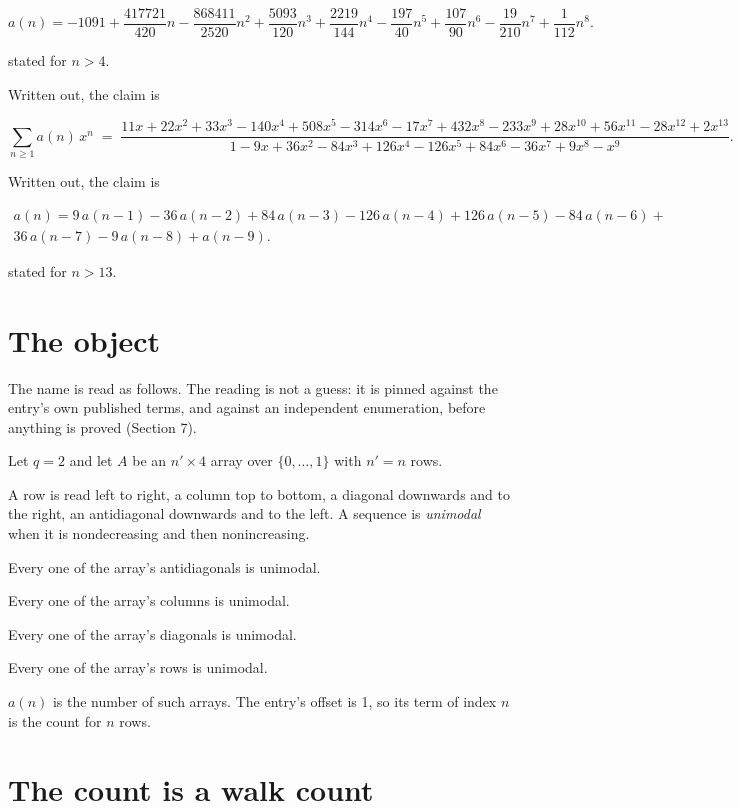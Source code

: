 \documentclass[11pt]{article}
\theoremstyle{definition}
\begin{document}
\[a(n) = -1091 + \frac{417721}{420}n - \frac{868411}{2520}n^{2} + \frac{5093}{120}n^{3} + \frac{2219}{144}n^{4} - \frac{197}{40}n^{5} + \frac{107}{90}n^{6} - \frac{19}{210}n^{7} + \frac{1}{112}n^{8}.\]

stated for $n > 4$.

Written out, the claim is

\[\sum_{n \ge 1} a(n)\,x^n \;=\; \frac{11x + 22x^{2} + 33x^{3} - 140x^{4} + 508x^{5} - 314x^{6} - 17x^{7} + 432x^{8} - 233x^{9} + 28x^{10} + 56x^{11} - 28x^{12} + 2x^{13}}{1 - 9x + 36x^{2} - 84x^{3} + 126x^{4} - 126x^{5} + 84x^{6} - 36x^{7} + 9x^{8} - x^{9}}.\]

Written out, the claim is

\begin{multline*} a(n) = 9\,a(n-1) - 36\,a(n-2) + 84\,a(n-3) - 126\,a(n-4) + 126\,a(n-5) - 84\,a(n-6) + \\ 36\,a(n-7) - 9\,a(n-8) + a(n-9). \end{multline*}

stated for $n > 13$.

\section{The object}

The name is read as follows. The reading is not a guess: it is pinned against the entry's own published terms, and against an independent enumeration, before anything is proved (Section 7).

Let $q = 2$ and let $A$ be an $n' \times 4$ array over $\{0,\dots,1\}$ with $n' = n$ rows.

A row is read left to right, a column top to bottom, a diagonal downwards and to the right, an antidiagonal downwards and to the left. A sequence is {\itshape unimodal} when it is nondecreasing and then nonincreasing.

Every one of the array's antidiagonals is unimodal.

Every one of the array's columns is unimodal.

Every one of the array's diagonals is unimodal.

Every one of the array's rows is unimodal.

$a(n)$ is the number of such arrays. The entry's offset is 1, so its term of index $n$ is the count for $n$ rows.

\section{The count is a walk count}
\end{document}
